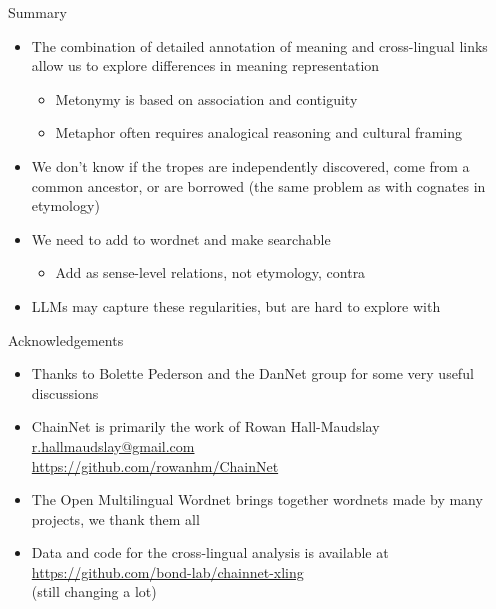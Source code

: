 \documentclass[dvipsnames]{beamer}
\newcommand{\email}[1]{\href{mailto:#1}{#1}}
\begin{document}
\begin{frame}{Summary}
  
\begin{itemize}
\item The combination of detailed annotation of meaning and
  cross-lingual links allow us to explore differences in meaning
  representation
  \begin{itemize}
  \item  Metonymy is based on association and contiguity
    \\ 
  \item  Metaphor often requires analogical reasoning and cultural framing
    \\ 
  \end{itemize}
\item We don't know if the tropes are independently discovered, come from a common ancestor, or are borrowed (the same problem as with cognates in etymology)
\item We need to add to wordnet and make searchable
  \begin{itemize}
  \item Add as sense-level relations, not etymology, contra \citet{khan-etal-2020-modelling}
  \end{itemize}
\item LLMs may capture these regularities, but are hard to explore with
\end{itemize}

\end{frame}

\begin{frame}{Acknowledgements}
  
\begin{itemize}
\item Thanks to Bolette Pederson and the DanNet group for some very useful discussions
\item ChainNet is primarily the work of Rowan Hall-Maudslay \email{r.hallmaudslay@gmail.com}
  \\ \url{https://github.com/rowanhm/ChainNet}
\item The Open Multilingual Wordnet brings together wordnets made by many projects, we thank them all
\item Data and code for the cross-lingual analysis is available at \url{https://github.com/bond-lab/chainnet-xling}
  \\ (still changing a lot)
\end{itemize}

\end{frame}
\end{document}
